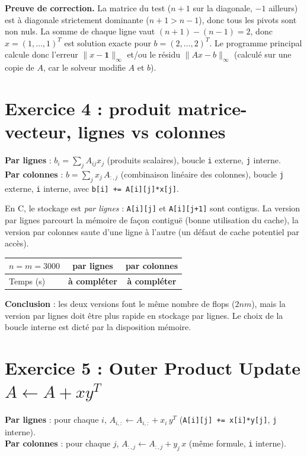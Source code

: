 \documentclass[10pt,a4paper]{article}
\begin{document}
\textbf{Preuve de correction.} La matrice du test
($n+1$ sur la diagonale, $-1$ ailleurs) est à diagonale strictement dominante
($n+1>n-1$), donc tous les pivots sont non nuls. La somme de chaque ligne vaut
$(n+1)-(n-1)=2$, donc $x=(1,\dots,1)^T$ est solution exacte pour
$b=(2,\dots,2)^T$. Le programme principal calcule donc l'erreur
$\|x-\mathbf 1\|_\infty$ et/ou le résidu $\|Ax-b\|_\infty$ (calculé sur une copie de
$A$, car le solveur modifie $A$ et $b$).

\section*{Exercice 4 : produit matrice-vecteur, lignes vs colonnes}
\textbf{Par lignes} : $b_i=\sum_j A_{ij}x_j$ (produits scalaires), boucle \texttt{i}
externe, \texttt{j} interne.\\
\textbf{Par colonnes} : $b=\sum_j x_j\,A_{:,j}$ (combinaison linéaire des colonnes),
boucle \texttt{j} externe, \texttt{i} interne, avec \texttt{b[i] += A[i][j]*x[j]}.

En C, le stockage est \emph{par lignes} : \texttt{A[i][j]} et \texttt{A[i][j+1]}
sont contigus. La version par lignes parcourt la mémoire de façon contiguë
(bonne utilisation du cache), la version par colonnes saute d'une ligne à l'autre
(un défaut de cache potentiel par accès).

\begin{center}
\begin{tabular}{lcc}
\toprule
$n=m=3000$ & par lignes & par colonnes\\
\midrule
Temps (s) & \textbf{à compléter} & \textbf{à compléter}\\
\bottomrule
\end{tabular}
\end{center}
\textbf{Conclusion} : les deux versions font le même nombre de flops ($2nm$), mais
la version par lignes doit être plus rapide en stockage par lignes. Le choix de la
boucle interne est dicté par la disposition mémoire.

\section*{Exercice 5 : Outer Product Update $A\leftarrow A+xy^T$}
\textbf{Par lignes} : pour chaque $i$, $A_{i,:}\leftarrow A_{i,:}+x_i\,y^T$
(\texttt{A[i][j] += x[i]*y[j]}, \texttt{j} interne).\\
\textbf{Par colonnes} : pour chaque $j$, $A_{:,j}\leftarrow A_{:,j}+y_j\,x$
(même formule, \texttt{i} interne).
\end{document}
